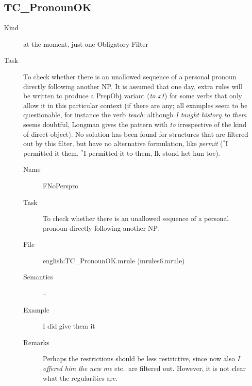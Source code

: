 \newpage
\subsection{TC\_PronounOK}
\begin{description}
\item[Kind] at the moment, just one Obligatory Filter
\item[Task] To check whether there is an unallowed sequence of a personal 
pronoun directly following another NP. It is assumed that one day, extra rules 
will be written to produce a PrepObj variant ({\em to x1\/}) for some verbs 
that only allow 
it in this particular context (if there are any; all examples seem to be 
questionable, for instance the verb {\em teach\/}: although {\em I taught 
history to them\/} seems doubtful, Longman gives the pattern with {\em to\/} 
irrespective of the kind of direct object). No solution has been found for 
structures that are filtered out by this 
filter, but have no alternative formulation, like {\em permit\/} ($^*$I 
permitted it them, $^*$I permitted it to them, Ik stond het hun toe).

\vspace{1 cm}
\begin{description}
\item[Name] FNoPerspro
\item[Task] To check whether there is an unallowed sequence of a personal 
pronoun directly following another NP. 
\item[File] english:TC\_PronounOK.mrule (mrules6.mrule)
\item[Semantics] --
\item[Example] I did give them it
\item[Remarks] Perhaps the restrictions should be less restrictive, since now 
also {\em I offered him the new me\/} etc.\ are filtered out. However, it is 
not clear what the regularities are.
\end{description}

\end{description}

\newpage
